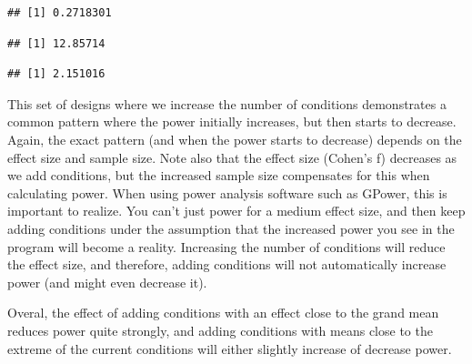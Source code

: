 \documentclass[]{book}
\newenvironment{Shaded}{\begin{snugshade}}{\end{snugshade}}
\newcommand{\KeywordTok}[1]{\textcolor[rgb]{0.13,0.29,0.53}{\textbf{#1}}}
\newcommand{\NormalTok}[1]{#1}
\newcommand{\OperatorTok}[1]{\textcolor[rgb]{0.81,0.36,0.00}{\textbf{#1}}}
\begin{document}
\begin{Shaded}
\end{Shaded}

\begin{verbatim}
## [1] 0.2718301
\end{verbatim}

\begin{Shaded}
\end{Shaded}

\begin{verbatim}
## [1] 12.85714
\end{verbatim}

\begin{Shaded}
\end{Shaded}

\begin{verbatim}
## [1] 2.151016
\end{verbatim}

This set of designs where we increase the number of conditions demonstrates a common pattern where the power initially increases, but then starts to decrease. Again, the exact pattern (and when the power starts to decrease) depends on the effect size and sample size. Note also that the effect size (Cohen's f) decreases as we add conditions, but the increased sample size compensates for this when calculating power. When using power analysis software such as GPower, this is important to realize. You can't just power for a medium effect size, and then keep adding conditions under the assumption that the increased power you see in the program will become a reality. Increasing the number of conditions will reduce the effect size, and therefore, adding conditions will not automatically increase power (and might even decrease it).

Overal, the effect of adding conditions with an effect close to the grand mean reduces power quite strongly, and adding conditions with means close to the extreme of the current conditions will either slightly increase of decrease power.
\end{document}

